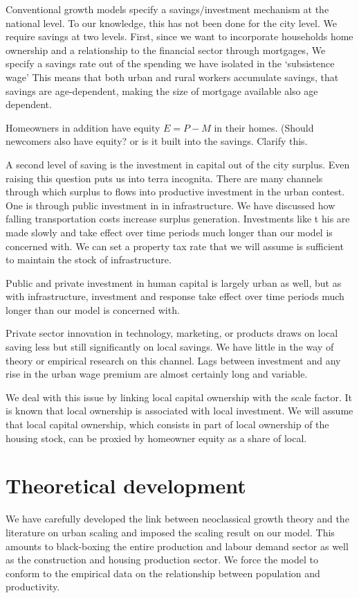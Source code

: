 Conventional growth models specify a savings/investment mechanism at the national level. To our knowledge, this has not been done for the city level. We require  savings at two levels. First, since we want to incorporate  households home ownership and a relationship to the financial sector through mortgages, We specify a savings rate out of the spending we have isolated in the `subsistence wage' This means that both urban and rural workers accumulate savings, that savings are age-dependent, making the size of mortgage available also age dependent. 

Homeowners in addition have equity $E=P-M$ in their homes.  ({\color{red}Should newcomers also have equity? or is it built into the savings. Clarify this.} 

A second level of saving is the  investment in capital out of the city surplus. Even raising this question puts us into terra incognita. There are many  channels through which surplus to flows into productive investment in the urban contest. One is through public investment in in infrastructure. We have discussed how falling transportation costs increase surplus generation. Investments like t his are made slowly and take effect over time periods much longer than our model is concerned with.  We can set a property tax rate   that we will assume is sufficient to maintain the stock of infrastructure.

Public and private investment in human capital is largely urban as well, but as with infrastructure, investment and response take effect over time periods much longer than our model is concerned with. 

Private sector innovation in technology, marketing, or products draws on local saving less but still significantly on local savings. We have little in the way of theory or empirical research on this channel. Lags between investment and any rise in the urban wage premium are almost certainly long and variable. 

We deal with this issue by linking local capital ownership with the scale factor. It is known that local ownership is associated with local investment. We will assume that local capital ownership, which consists in part of local ownership of the housing stock, can be proxied by homeowner equity as a share of local. 




 
\section{Theoretical development}%
We have carefully developed the link between neoclassical growth theory and the literature on urban scaling \cite{bettencourtIntroductionUrbanScience2021} and imposed the scaling result on our model. This amounts to black-boxing the entire production and labour demand sector as well as the construction and housing production sector. We force the model to conform to the empirical data on the relationship between population and productivity.

